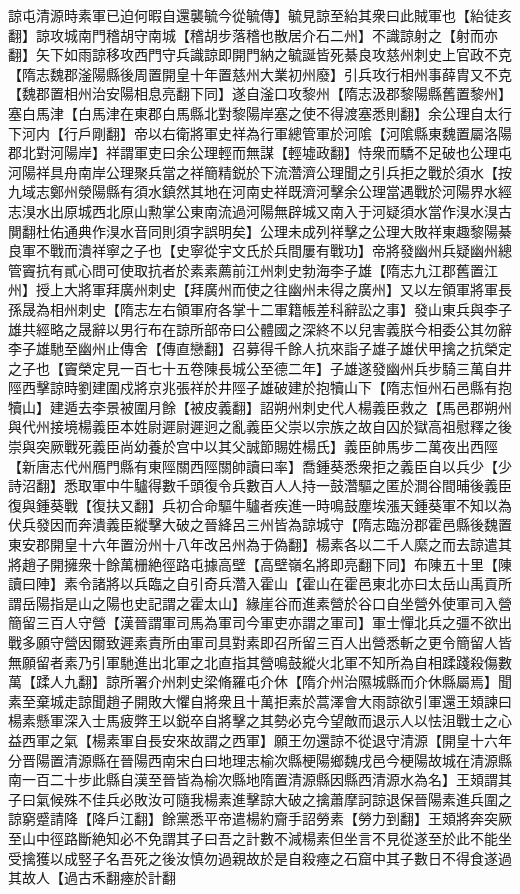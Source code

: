 諒屯清源時素軍已迫何暇自還襲毓今從毓傳】毓見諒至紿其衆曰此賊軍也【紿徒亥翻】諒攻城南門稽胡守南城【稽胡步落稽也散居介石二州】不識諒射之【射而亦翻】矢下如雨諒移攻西門守兵識諒即開門納之毓誕皆死綦良攻慈州刺史上官政不克【隋志魏郡滏陽縣後周置開皇十年置慈州大業初州廢】引兵攻行相州事薛胄又不克【魏郡置相州治安陽相息亮翻下同】遂自滏口攻黎州【隋志汲郡黎陽縣舊置黎州】塞白馬津【白馬津在東郡白馬縣北對黎陽岸塞之使不得渡塞悉則翻】余公理自太行下河内【行戶剛翻】帝以右衛將軍史祥為行軍總管軍於河隂【河隂縣東魏置屬洛陽郡北對河陽岸】祥謂軍吏曰余公理輕而無謀【輕墟政翻】恃衆而驕不足破也公理屯河陽祥具舟南岸公理聚兵當之祥簡精鋭於下流濳濟公理聞之引兵拒之戰於須水【按九域志鄭州滎陽縣有須水鎮然其地在河南史祥既濟河擊余公理當遇戰於河陽界水經志湨水出原城西北原山勲掌公東南流過河陽無辟城又南入于河疑須水當作湨水湨古閴翻杜佑通典作湨水音同則須字誤明矣】公理未成列祥擊之公理大敗祥東趣黎陽綦良軍不戰而潰祥寧之子也【史寧從宇文氏於兵間屢有戰功】帝將發幽州兵疑幽州總管竇抗有貳心問可使取抗者於素素薦前江州刺史勃海李子雄【隋志九江郡舊置江州】授上大將軍拜廣州刺史【拜廣州而使之往幽州未得之廣州】又以左領軍將軍長孫晟為相州刺史【隋志左右領軍府各掌十二軍籍帳差科辭訟之事】發山東兵與李子雄共經略之晟辭以男行布在諒所部帝曰公體國之深終不以兒害義朕今相委公其勿辭李子雄馳至幽州止傳舍【傳直戀翻】召募得千餘人抗來詣子雄子雄伏甲擒之抗榮定之子也【竇榮定見一百七十五卷陳長城公至德二年】子雄遂發幽州兵步騎三萬自井陘西擊諒時劉建圍戍將京兆張祥於井陘子雄破建於抱犢山下【隋志恒州石邑縣有抱犢山】建遁去李景被圍月餘【被皮義翻】詔朔州刺史代人楊義臣救之【馬邑郡朔州與代州接境楊義臣本姓尉遲尉遲迥之亂義臣父崇以宗族之故自囚於獄高祖慰釋之後崇與突厥戰死義臣尚幼養於宫中以其父誠節賜姓楊氏】義臣帥馬步二萬夜出西陘【新唐志代州鴈門縣有東陘關西陘關帥讀曰率】喬鍾葵悉衆拒之義臣自以兵少【少詩沼翻】悉取軍中牛驢得數千頭復令兵數百人人持一鼓濳驅之匿於澗谷間晡後義臣復與鍾葵戰【復扶又翻】兵初合命驅牛驢者疾進一時鳴鼓塵埃漲天鍾葵軍不知以為伏兵發因而奔潰義臣縱擊大破之晉絳呂三州皆為諒城守【隋志臨汾郡霍邑縣後魏置東安郡開皇十六年置汾州十八年改呂州為于偽翻】楊素各以二千人縻之而去諒遣其將趙子開擁衆十餘萬栅絶徑路屯據高壁【高壁嶺名將即亮翻下同】布陳五十里【陳讀曰陣】素令諸將以兵臨之自引奇兵濳入霍山【霍山在霍邑東北亦曰太岳山禹貢所謂岳陽指是山之陽也史記謂之霍太山】緣崖谷而進素營於谷口自坐營外使軍司入營簡留三百人守營【漢晉謂軍司馬為軍司今軍吏亦謂之軍司】軍士憚北兵之彊不欲出戰多願守營因爾致遲素責所由軍司具對素即召所留三百人出營悉斬之更令簡留人皆無願留者素乃引軍馳進出北軍之北直指其營鳴鼓縱火北軍不知所為自相蹂踐殺傷數萬【蹂人九翻】諒所署介州刺史梁脩羅屯介休【隋介州治隰城縣而介休縣屬焉】聞素至棄城走諒聞趙子開敗大懼自將衆且十萬拒素於蒿澤會大雨諒欲引軍還王頍諫曰楊素懸軍深入士馬疲弊王以鋭卒自將擊之其勢必克今望敵而退示人以怯沮戰士之心益西軍之氣【楊素軍自長安來故謂之西軍】願王勿還諒不從退守清源【開皇十六年分晋陽置清源縣在晉陽西南宋白曰地理志榆次縣梗陽鄉魏戌邑今梗陽故城在清源縣南一百二十步此縣自漢至晉皆為榆次縣地隋置清源縣因縣西清源水為名】王頍謂其子曰氣候殊不佳兵必敗汝可隨我楊素進擊諒大破之擒蕭摩訶諒退保晉陽素進兵圍之諒窮蹙請降【降戶江翻】餘黨悉平帝遣楊約齎手詔勞素【勞力到翻】王頍將奔突厥至山中徑路斷絶知必不免謂其子曰吾之計數不減楊素但坐言不見從遂至於此不能坐受擒獲以成竪子名吾死之後汝慎勿過親故於是自殺瘞之石窟中其子數日不得食遂過其故人【過古禾翻瘞於計翻
